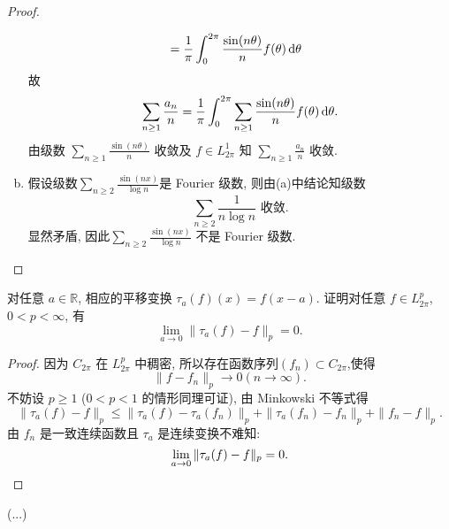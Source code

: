 \begin{proof}
\begin{enumerate}[(a)]
\[\begin{split}
        & = \frac{1}{\pi}\int_0^{2\pi}\frac{\sin(n\theta)}{n}f(\theta)\mathop{}\!\mathrm{d}\theta
      \end{split}\]
      故
      \[\sum_{n\geq 1}\frac{a_n}{n}
        = \frac{1}{\pi}\int_0^{2\pi}\sum_{n\geq 1}\frac{\sin(n\theta)}{n}f(\theta)\mathop{}\!\mathrm{d}\theta.\]
      由级数 $\sum_{n\geq 1}\frac{\sin(n\theta)}{n}$ 收敛及 $f\in L_{2\pi}^1$
      知 $\sum_{n\geq 1}\frac{a_n}{n}$ 收敛.
    \item 假设级数$\sum_{n\geq 2}\frac{\sin(nx)}{\log n}$是 Fourier 级数, 则由(a)中结论知级数
      \[\sum_{n\geq 2}\frac{1}{n\log n} \text{ 收敛}.\]
      显然矛盾, 因此$\sum_{n\geq 2}\frac{\sin(nx)}{\log n}$ 不是 Fourier 级数.
  \end{enumerate}
\end{proof}


\begin{exercise}[17]
  对任意 $a\in\mathbb{R}$, 相应的平移变换 $\tau_a(f)(x) = f(x-a)$.
  证明对任意 $f\in L_{2\pi}^p$, $0<p<\infty$, 有
  \[\lim_{a\to 0} \|\tau_a(f) - f\|_p = 0.\]
\end{exercise}

\begin{proof}
  因为 $C_{2\pi}$ 在 $L_{2\pi}^p$ 中稠密, 所以存在函数序列$(f_n)\subset C_{2\pi}$,使得
  \[\|f-f_n\|_p\to0(n\to\infty).\]
  不妨设 $p\geq 1$ ($0<p<1$ 的情形同理可证), 由 Minkowski 不等式得
  \[\|\tau_a(f)-f\|_p\leq\|\tau_a(f)-\tau_a(f_n)\|_p+\|\tau_a(f_n)-f_n\|_p+\|f_n-f\|_p.\]
  由 $f_n$ 是一致连续函数且 $\tau_a$ 是连续变换不难知:
  \[\lim_{a\to0}\|\tau_a(f)-f\|_p=0.\qedhere\]
\end{proof}


\begin{exercise}[18]
(...)
\end{exercise}

